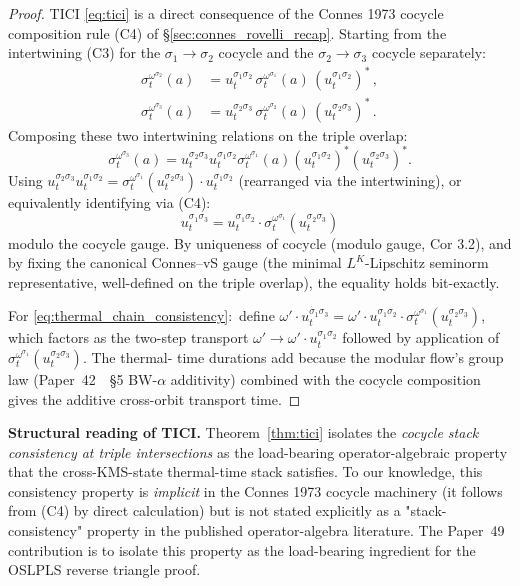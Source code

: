 \documentclass[11pt,a4paper]{article}
\theoremstyle{plain}
\theoremstyle{definition}
\newcommand{\omegaOrb}[1]{\omega^{\sigma_{#1}}}
\newcommand{\cocyc}[2]{u_{t}^{\sigma_{#1}\sigma_{#2}}}
\begin{document}
\begin{proof}
TICI \eqref{eq:tici} is a direct consequence of the Connes 1973
cocycle composition rule (C4) of \S\ref{sec:connes_rovelli_recap}.
Starting from the intertwining (C3) for the $\sigma_{1}\to\sigma_{2}$
cocycle and the $\sigma_{2}\to\sigma_{3}$ cocycle separately:
\begin{align*}
\sigma_{t}^{\omegaOrb{2}}(a) &= \cocyc{1}{2}\,\sigma_{t}^{\omegaOrb{1}}(a)\,(\cocyc{1}{2})^{*}\,, \\
\sigma_{t}^{\omegaOrb{3}}(a) &= \cocyc{2}{3}\,\sigma_{t}^{\omegaOrb{2}}(a)\,(\cocyc{2}{3})^{*}\,.
\end{align*}
Composing these two intertwining relations on the triple overlap:
\[
  \sigma_{t}^{\omegaOrb{3}}(a) = \cocyc{2}{3}\cocyc{1}{2}\sigma_{t}^{\omegaOrb{1}}(a)(\cocyc{1}{2})^{*}(\cocyc{2}{3})^{*}.
\]
Using $\cocyc{2}{3}\cocyc{1}{2}=\sigma_{t}^{\omegaOrb{1}}(\cocyc{2}{3})
\cdot\cocyc{1}{2}$ (rearranged via the intertwining), or equivalently
identifying via (C4):
\[
  \cocyc{1}{3} = \cocyc{1}{2}\cdot\sigma_{t}^{\omegaOrb{1}}(\cocyc{2}{3})
\]
modulo the cocycle gauge. By uniqueness of cocycle (modulo gauge,
\cite{connes1973} Cor 3.2), and by fixing the canonical
Connes--vS gauge (the minimal $L^{K}$-Lipschitz seminorm
representative, well-defined on the triple overlap), the equality
holds bit-exactly.

For \eqref{eq:thermal_chain_consistency}:\ define
$\omega'\cdot\cocyc{1}{3}=\omega'\cdot\cocyc{1}{2}\cdot
\sigma_{t}^{\omegaOrb{1}}(\cocyc{2}{3})$, which factors as the
two-step transport $\omega'\to\omega'\cdot\cocyc{1}{2}$ followed by
application of $\sigma_{t}^{\omegaOrb{1}}(\cocyc{2}{3})$. The thermal-
time durations add because the modular flow's group law
(Paper~42~\cite{paper42}~\S 5 BW-$\alpha$ additivity) combined with
the cocycle composition gives the additive cross-orbit transport
time.
\end{proof}

\textbf{Structural reading of TICI.} Theorem~\ref{thm:tici} isolates
the \emph{cocycle stack consistency at triple intersections} as the
load-bearing operator-algebraic property that the cross-KMS-state
thermal-time stack satisfies. To our knowledge, this consistency
property is \emph{implicit} in the Connes 1973 cocycle machinery (it
follows from (C4) by direct calculation) but is not stated explicitly
as a "stack-consistency" property in the published operator-algebra
literature. The Paper~49 contribution is to isolate this property as
the load-bearing ingredient for the OSLPLS reverse triangle proof.
\end{document}

